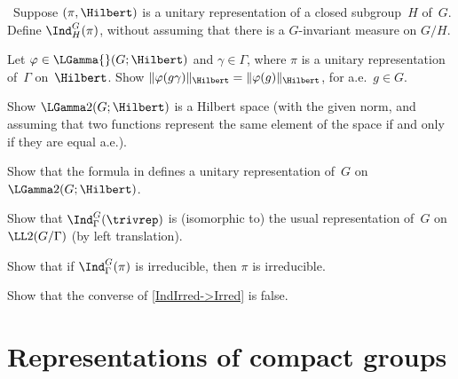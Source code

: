 \begin{exercises}

\item \label{GenInducedRepEx}
\optional\ 
Suppose $(\pi,\Hilbert)$ is a unitary representation of a closed subgroup~$H$ of~$G$. 
Define $\Ind_H^G(\pi)$, without assuming that there is a $G$-invariant measure on $G/H$.

\item \label{Norm(gGamma)WD}
Let $\varphi \in \LGamma{}(G; \Hilbert)$ and $\gamma \in \Gamma$, where $\pi$ is a unitary representation of~$\Gamma$ on~$\Hilbert$. Show $\| \varphi(g \gamma) \|_\Hilbert = \| \varphi(g) \|_\Hilbert$, for a.e.\ $g \in G$.

\item \label{L2(G;V)Hilbert}
Show $\LGamma2(G;\Hilbert)$ is a Hilbert space (with the given norm, and assuming that two functions represent the same element of the space if and only if they are equal a.e.).

\item \label{GActsL2(G;V)}
Show that the formula in  defines a unitary representation of~$G$ on $\LGamma2(G;\Hilbert)$.

\item \label{Ind1=L2(G/Gamma)}
Show that $\Ind_\Gamma ^G(\trivrep)$ is (isomorphic to) the usual representation of~$G$ on $\LL2(G/\Gamma)$ (by left translation).

\item \label{IndIrred->Irred}
Show that if $\Ind_\Gamma^G(\pi)$ is irreducible, then $\pi$ is irreducible.

\item Show that the converse of \cref{IndIrred->Irred} is false.

\end{exercises}





\section{Representations of compact groups}

